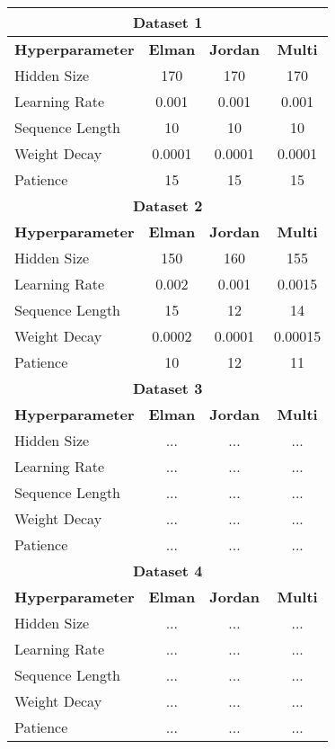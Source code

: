 
\begin{table}[H] 
    \centering 
    \begin{tabular}{|l|c|c|c|} 
        \hline 
        \multicolumn{4}{|c|}{\textbf{Dataset 1}} \\ \hline
        \textbf{Hyperparameter} & \textbf{Elman} & \textbf{Jordan} & \textbf{Multi} \\ 
        \hline 
        Hidden Size & 170 & 170 & 170 \\ 
        \hline
        Learning Rate & 0.001 & 0.001 & 0.001 \\ 
        \hline
        Sequence Length & 10 & 10 & 10 \\ 
        \hline
        Weight Decay & 0.0001 & 0.0001 & 0.0001 \\ 
        \hline
        Patience & 15 & 15 & 15 \\ 
        \hline 
        
        \multicolumn{4}{|c|}{\textbf{Dataset 2}} \\ \hline
        \textbf{Hyperparameter} & \textbf{Elman} & \textbf{Jordan} & \textbf{Multi} \\ 
        \hline 
        Hidden Size & 150 & 160 & 155 \\ 
        \hline
        Learning Rate & 0.002 & 0.001 & 0.0015 \\ 
        \hline
        Sequence Length & 15 & 12 & 14 \\ 
        \hline
        Weight Decay & 0.0002 & 0.0001 & 0.00015 \\ 
        \hline
        Patience & 10 & 12 & 11 \\ 
        \hline 
        
        \multicolumn{4}{|c|}{\textbf{Dataset 3}} \\ \hline
        \textbf{Hyperparameter} & \textbf{Elman} & \textbf{Jordan} & \textbf{Multi} \\ 
        \hline 
        Hidden Size & ... & ... & ... \\ 
        \hline
        Learning Rate & ... & ... & ... \\ 
        \hline
        Sequence Length & ... & ... & ... \\ 
        \hline
        Weight Decay & ... & ... & ... \\ 
        \hline
        Patience & ... & ... & ... \\ 
        \hline 
        
        \multicolumn{4}{|c|}{\textbf{Dataset 4}} \\ \hline
        \textbf{Hyperparameter} & \textbf{Elman} & \textbf{Jordan} & \textbf{Multi} \\ 
        \hline 
        Hidden Size & ... & ... & ... \\ 
        \hline
        Learning Rate & ... & ... & ... \\ 
        \hline
        Sequence Length & ... & ... & ... \\ 
        \hline
        Weight Decay & ... & ... & ... \\ 
        \hline
        Patience & ... & ... & ... \\ 
        \hline 
        

\end{tabular}
\end{table}

